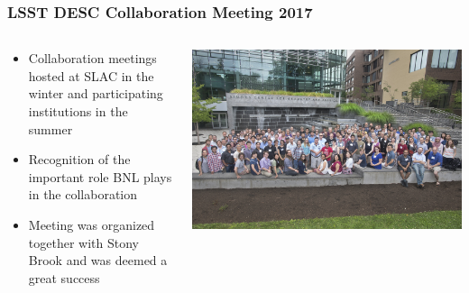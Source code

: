 \documentclass[aspectratio=169]{beamer}
\begin{document}
\begin{frame}
  \frametitle{LSST DESC Collaboration Meeting 2017 }
  
  \begin{columns}
    \begin{column}{0.4\textwidth}
      \begin{itemize}
      \item Collaboration meetings hosted at SLAC in the winter and
        participating institutions in the summer
      \item Recognition of the important role BNL plays in the
        collaboration
      \item Meeting was organized together with Stony Brook and was
        deemed a great success

      \end{itemize}
    \end{column}
    \begin{column}{0.6\textwidth}
      \includegraphics[width=\linewidth]{./D0680717.jpg}
    \end{column}
  \end{columns}


\end{frame}

{
\frame
{
}
}
\end{document}

